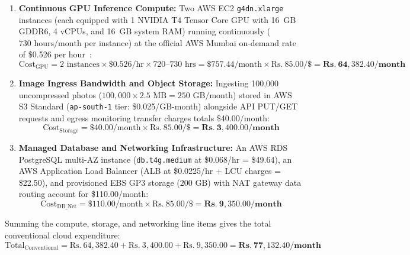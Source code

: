 \documentclass[12pt,a4paper,oneside]{report}
\begin{document}
\begin{enumerate}
    \item \textbf{Continuous GPU Inference Compute:}
    Two AWS EC2 \texttt{g4dn.xlarge} instances (each equipped with 1 NVIDIA T4 Tensor Core GPU with 16~GB GDDR6, 4 vCPUs, and 16~GB system RAM) running continuously ($730\text{~hours/month}$ per instance) at the official AWS Mumbai on-demand rate of \$0.526 per hour~\cite{aws_pricing_g4dn}:
    \begin{equation}
    \text{Cost}_{\text{GPU}} = 2 \text{ instances} \times \$0.526/\text{hr} \times 720\text{--}730\text{ hrs} = \$757.44/\text{month} \times \text{Rs.}~85.00/\$ = \mathbf{\text{Rs.}~64,382.40/\text{month}}
    \end{equation}
    \item \textbf{Image Ingress Bandwidth and Object Storage:}
    Ingesting 100,000 uncompressed photos ($100,000 \times 2.5\text{~MB} = 250\text{~GB/month}$) stored in AWS S3 Standard (\texttt{ap-south-1} tier: \$0.025/GB-month) alongside API PUT/GET requests and egress monitoring transfer charges totals \$40.00/month:
    \begin{equation}
    \text{Cost}_{\text{Storage}} = \$40.00/\text{month} \times \text{Rs.}~85.00/\$ = \mathbf{\text{Rs.}~3,400.00/\text{month}}
    \end{equation}
    \item \textbf{Managed Database and Networking Infrastructure:}
    An AWS RDS PostgreSQL multi-AZ instance (\texttt{db.t4g.medium} at \$0.068/hr = \$49.64), an AWS Application Load Balancer (ALB at \$0.0225/hr + LCU charges = \$22.50), and provisioned EBS GP3 storage ($200\text{~GB}$) with NAT gateway data routing account for \$110.00/month:
    \begin{equation}
    \text{Cost}_{\text{DB\_Net}} = \$110.00/\text{month} \times \text{Rs.}~85.00/\$ = \mathbf{\text{Rs.}~9,350.00/\text{month}}
    \end{equation}
\end{enumerate}
Summing the compute, storage, and networking line items gives the total conventional cloud expenditure:
\begin{equation}
\text{Total}_{\text{Conventional}} = \text{Rs.}~64,382.40 + \text{Rs.}~3,400.00 + \text{Rs.}~9,350.00 = \mathbf{\text{Rs.}~77,132.40/\text{month}}
\end{equation}
\end{document}
